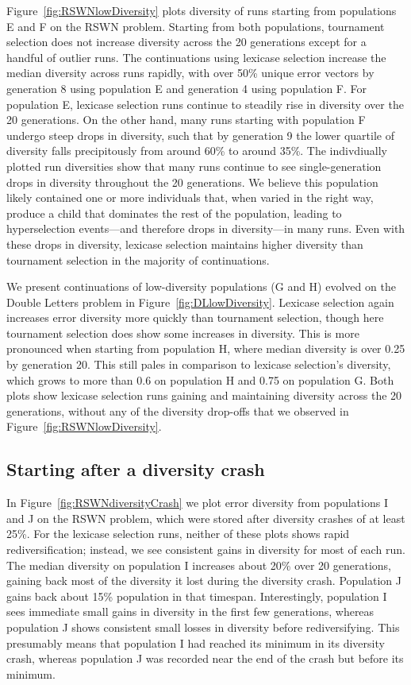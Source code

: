 \documentclass{sig-alternate-05-2015}
\begin{document}
Figure~\ref{fig:RSWNlowDiversity} plots diversity of runs starting from populations E and F on the RSWN problem. Starting from both populations, tournament selection does not increase diversity across the 20 generations except for a handful of outlier runs. The continuations using lexicase selection increase the median diversity across runs rapidly, with over 50\% unique error vectors by generation 8 using population E and generation 4 using population F. For population E, lexicase selection runs continue to steadily rise in diversity over the 20 generations. On the other hand, many runs starting with population F undergo steep drops in diversity, such that by generation 9 the lower quartile of diversity falls precipitously from around 60\% to around 35\%. The indivdiually plotted run diversities show that many runs continue to see single-generation drops in diversity throughout the 20 generations. We believe this population likely contained one or more individuals that, when varied in the right way, produce a child that dominates the rest of the population, leading to hyperselection events---and therefore drops in diversity---in many runs. Even with these drops in diversity, lexicase selection maintains higher diversity than tournament selection in the majority of continuations.

We present continuations of low-diversity populations (G and H) evolved on the Double Letters problem in Figure~\ref{fig:DLlowDiversity}. Lexicase selection again increases error diversity more quickly than tournament selection, though here tournament selection does show some increases in diversity. This is more pronounced when starting from population H, where median diversity is over 0.25 by generation 20. This still pales in comparison to lexicase selection's diversity, which grows to more than 0.6 on population H and 0.75 on population G. Both plots show lexicase selection runs gaining and maintaining diversity across the 20 generations, without any of the diversity drop-offs that we observed in Figure~\ref{fig:RSWNlowDiversity}.


\subsection{Starting after a diversity crash}
\label{sec:crashDiversityResults}


In Figure~\ref{fig:RSWNdiversityCrash} we plot error diversity from populations I and J on the RSWN problem, which were stored after diversity crashes of at least 25\%.
For the lexicase selection runs, neither of these plots shows rapid rediversification; instead, we see consistent gains in diversity for most of each run.
The median diversity on population I increases about 20\% over 20 generations, gaining back most of the diversity it lost during the diversity crash. Population J gains back about 15\% population in that timespan.
Interestingly, population I sees immediate small gains in diversity in the first few generations, whereas population J shows consistent small losses in diversity before rediversifying. This presumably means that population I had reached its minimum in its diversity crash, whereas population J was recorded near the end of the crash but before its minimum.
\end{document}
